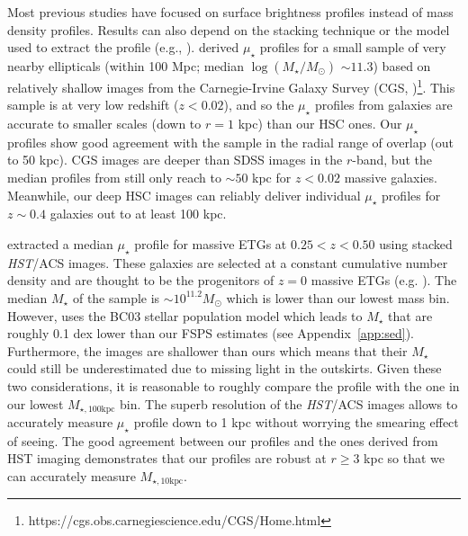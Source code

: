 \documentclass[a4paper,fleqn,usenatbib]{mnras}
\def\mstar{{$M_{\star}$}}
\def\logms{{$\log (M_{\star}/M_{\odot})$}}
\def\minn{{$M_{\star,10\mathrm{kpc}}$}}
\def\mtot{{$M_{\star,100\mathrm{kpc}}$}}
\def\mden{{$\mu_{\star}$}}
\begin{document}
    Most previous studies have focused on surface brightness profiles instead 
    of mass density profiles.  
    Results can also depend on the stacking technique or the model used to extract 
    the profile (e.g., \citealt{Tal2011, DSouza2015}). 
    \citet{Huang2013a} derived \mden{} profiles for a small sample of very nearby 
    ellipticals (within 100 Mpc; median \logms{} ${\sim} 11.3$) based on relatively 
    shallow images from the Carnegie-Irvine Galaxy Survey 
    (CGS, \citealt{CGS1})\footnote{https://cgs.obs.carnegiescience.edu/CGS/Home.html}.  
    This sample is at very low redshift ($z<0.02$), and so the \mden{} profiles from 
    \citet{Huang2013a} galaxies are accurate to smaller scales (down to $r=1$ kpc) 
    than our HSC ones.  
    Our \mden{} profiles show good agreement with the \citet{Huang2013a} sample in 
    the radial range of overlap (out to 50 kpc). 
    CGS images are deeper than SDSS images in the $r$-band, but the median 
    profiles from \citet{Huang2013a} still only reach to ${\sim} 50$ kpc for 
    $z<0.02$ massive galaxies.
    Meanwhile, our deep HSC images can reliably deliver individual \mden{} profiles 
    for $z{\sim} 0.4$ galaxies out to at least 100 kpc.  
    
    \citet{Patel2013} extracted a median \mden{} profile for massive ETGs at 
    $0.25 < z < 0.50$ using stacked \textit{HST}/ACS images. 
    These galaxies are selected at a constant cumulative number density and are 
    thought to be the progenitors of $z=0$ massive ETGs (e.g. \citealt{Leja2013}).  
    The median \mstar{} of the \citet{Patel2013} sample is 
    ${\sim} 10^{11.2} M_{\odot}$ which is lower than our lowest mass bin. 
    However, \citet{Patel2013} uses the BC03 stellar population model which leads to 
    \mstar{} that are roughly 0.1 dex lower than our FSPS estimates 
    (see Appendix~\ref{app:sed}). 
    Furthermore, the \citet{Patel2013} images are shallower than ours which means 
    that their \mstar{} could still be underestimated due to missing light in the 
    outskirts. 
    Given these two considerations, it is reasonable to roughly compare the 
    \citet{Patel2013} profile with the one in our lowest \mtot{} bin. 
    The superb resolution of the \textit{HST}/ACS images allows \citet{Patel2013} to 
    accurately measure \mden{} profile down to 1 kpc without worrying the smearing 
    effect of seeing. 
    The good agreement between our profiles and the ones derived from HST imaging 
    demonstrates that our profiles are robust at $r\geq 3$ kpc so that we can 
    accurately measure \minn{}.
    
\end{document}
